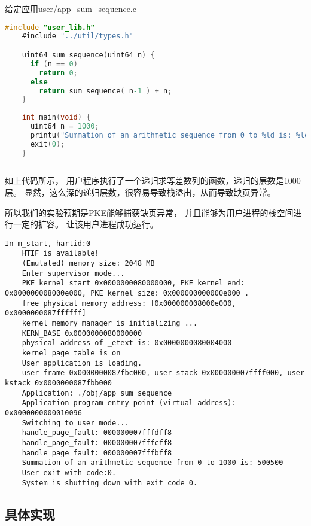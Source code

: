 给定应用user/app\_sum\_sequence.c

\begin{lstlisting}[caption={用户态应用app\_sum\_sequence.c}, label={lst:app_sum_sequence}, language=C]
    #include "user_lib.h"
    #include "../util/types.h"

    uint64 sum_sequence(uint64 n) {
      if (n == 0)
        return 0;
      else
        return sum_sequence( n-1 ) + n;
    }
    
    int main(void) {
      uint64 n = 1000;
      printu("Summation of an arithmetic sequence from 0 to %ld is: %ld \n", n, sum_sequence(n) );
      exit(0);
    }
        
\end{lstlisting}

如上代码所示，
用户程序执行了一个递归求等差数列的函数，递归的层数是1000层。
显然，这么深的递归层数，很容易导致栈溢出，从而导致缺页异常。

所以我们的实验预期是PKE能够捕获缺页异常，
并且能够为用户进程的栈空间进行一定的扩容。
让该用户进程成功运行。

\begin{lstlisting}[caption={lab6实验结果（移植K210前）}]
    In m_start, hartid:0
    HTIF is available!
    (Emulated) memory size: 2048 MB
    Enter supervisor mode...
    PKE kernel start 0x0000000080000000, PKE kernel end: 0x000000008000e000, PKE kernel size: 0x000000000000e000 .
    free physical memory address: [0x000000008000e000, 0x0000000087ffffff]
    kernel memory manager is initializing ...
    KERN_BASE 0x0000000080000000
    physical address of _etext is: 0x0000000080004000
    kernel page table is on
    User application is loading.
    user frame 0x0000000087fbc000, user stack 0x000000007ffff000, user kstack 0x0000000087fbb000
    Application: ./obj/app_sum_sequence
    Application program entry point (virtual address): 0x0000000000010096
    Switching to user mode...
    handle_page_fault: 000000007fffdff8
    handle_page_fault: 000000007fffcff8
    handle_page_fault: 000000007fffbff8
    Summation of an arithmetic sequence from 0 to 1000 is: 500500
    User exit with code:0.
    System is shutting down with exit code 0.    
\end{lstlisting}

\subsection{具体实现}

